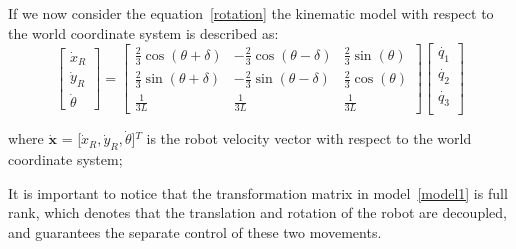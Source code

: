 If we now consider the equation~\ref{rotation} the kinematic model with respect to the world coordinate system is described as:
\begin{equation}
\begin{bmatrix}
\dot{x}_R\\
\dot{y}_R\\
\dot{\theta}
\end{bmatrix} =
\begin{bmatrix}
\frac{2}{3}\cos(\theta+\delta) & -\frac{2}{3}\cos(\theta-\delta) & \frac{2}{3}\sin(\theta)\\
\frac{2}{3}\sin(\theta+\delta) & -\frac{2}{3}\sin(\theta-\delta) & \frac{2}{3}\cos(\theta)\\
\frac{1}{3L} & \frac{1}{3L} & \frac{1}{3L}
\end{bmatrix}
\begin{bmatrix}
\dot{q_1}\\
\dot{q_2}\\
\dot{q_3}\\
\end{bmatrix}	
\label{model2}
\end{equation}

where $\mathbf{\dot{x}}$ = [$\dot{x}_R,\dot{y}_R,\dot{\theta}$]$^T$ is the robot velocity vector with respect to the world coordinate system;

It is important to notice that the transformation matrix in model~\ref{model1} is full rank, which denotes that the translation and rotation of the robot are decoupled, and guarantees the separate control of these two movements.

